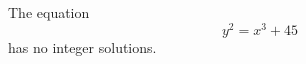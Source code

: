 \begin{proposition}
    The equation
\[
    y^2=x^3+45
\]
    has no integer solutions.
\end{proposition}
